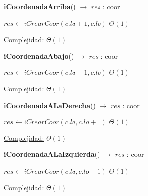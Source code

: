 \begin{Algoritmos}
\begin{algorithm}[H]{\textbf{iCoordenadaArriba}() $\to$ $res$ : coor}
    	\begin{algorithmic}[1]
			\State $res \gets iCrearCoor(c.la + 1, c.lo)$ \Comment $\Theta(1)$
			
			\medskip
			\Statex \underline{Complejidad:} $\Theta(1)$
    	\end{algorithmic}
\end{algorithm}

\begin{algorithm}[H]{\textbf{iCoordenadaAbajo}() $\to$ $res$ : coor}
    	\begin{algorithmic}[1]
			\State $res \gets iCrearCoor(c.la - 1, c.lo)$ \Comment $\Theta(1)$
			
			\medskip
			\Statex \underline{Complejidad:} $\Theta(1)$
    	\end{algorithmic}
\end{algorithm}

\begin{algorithm}[H]{\textbf{iCoordenadaALaDerecha}() $\to$ $res$ : coor}
    	\begin{algorithmic}[1]
			\State $res \gets iCrearCoor(c.la, c.lo + 1)$ \Comment $\Theta(1)$
			
			\medskip
			\Statex \underline{Complejidad:} $\Theta(1)$
    	\end{algorithmic}
\end{algorithm}

\begin{algorithm}[H]{\textbf{iCoordenadaALaIzquierda}() $\to$ $res$ : coor}
    	\begin{algorithmic}[1]
			\State $res \gets iCrearCoor(c.la, c.lo - 1)$ \Comment $\Theta(1)$
			
			\medskip
			\Statex \underline{Complejidad:} $\Theta(1)$
    	\end{algorithmic}
\end{algorithm}

\end{Algoritmos}
